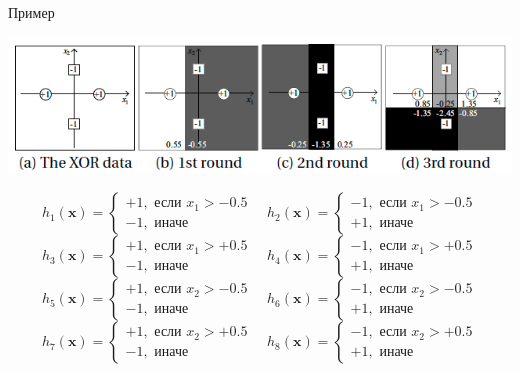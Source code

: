 \documentclass[10pt,a4paper]{beamer}
\begin{document}
\begin{frame}{Пример}

\vspace{-2em}
\begin{center}
\includegraphics[scale=0.5]{images/xor.png}
\end{center}

\vspace{-2em}
\begin{small}
\[
h_1(\mathbf{x}) = \begin{cases}
+1, \text{ если } x_1 > -0.5 \\ 
-1, \text{ иначе }
\end{cases} \quad
h_2(\mathbf{x}) = \begin{cases}
-1, \text{ если } x_1 > -0.5 \\ 
+1, \text{ иначе }
\end{cases}
\]
\[
h_3(\mathbf{x}) = \begin{cases}
+1, \text{ если } x_1 > +0.5 \\ 
-1, \text{ иначе }
\end{cases} \quad
h_4(\mathbf{x}) = \begin{cases}
-1, \text{ если } x_1 > +0.5 \\ 
+1, \text{ иначе }
\end{cases}
\]
\[
h_5(\mathbf{x}) = \begin{cases}
+1, \text{ если } x_2 > -0.5 \\ 
-1, \text{ иначе }
\end{cases} \quad
h_6(\mathbf{x}) = \begin{cases}
-1, \text{ если } x_2 > -0.5 \\ 
+1, \text{ иначе }
\end{cases}
\]
\[
h_7(\mathbf{x}) = \begin{cases}
+1, \text{ если } x_2 > +0.5 \\ 
-1, \text{ иначе }
\end{cases} \quad
h_8(\mathbf{x}) = \begin{cases}
-1, \text{ если } x_2 > +0.5 \\ 
+1, \text{ иначе }
\end{cases}
\]
\end{small}

\end{frame}
\end{document}
